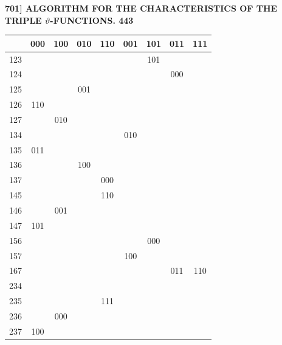 \documentclass[11pt]{article}
\begin{document}
\bigskip
\noindent\textbf{701] \quad ALGORITHM FOR THE CHARACTERISTICS OF THE TRIPLE $\vartheta$-FUNCTIONS. \hfill 443}

\medskip

\begin{center}
\begin{tabular}{|c||c|c|c|c|c|c|c|c|}
\hline
     & 000 & 100 & 010 & 110 & 001 & 101 & 011 & 111 \\
\hline\hline
123  &     &     &     &     &     & 101 &     &     \\
\hline
124  &     &     &     &     &     &     & 000 &     \\
\hline
125  &     &     & 001 &     &     &     &     &     \\
\hline
126  & 110 &     &     &     &     &     &     &     \\
\hline
127  &     & 010 &     &     &     &     &     &     \\
\hline
134  &     &     &     &     & 010 &     &     &     \\
\hline
135  & 011 &     &     &     &     &     &     &     \\
\hline
136  &     &     & 100 &     &     &     &     &     \\
\hline
137  &     &     &     & 000 &     &     &     &     \\
\hline
145  &     &     &     & 110 &     &     &     &     \\
\hline
146  &     & 001 &     &     &     &     &     &     \\
\hline
147  & 101 &     &     &     &     &     &     &     \\
\hline
156  &     &     &     &     &     & 000 &     &     \\
\hline
157  &     &     &     &     & 100 &     &     &     \\
\hline
167  &     &     &     &     &     &     & 011 & 110 \\
\hline\hline
234  &     &     &     &     &     &     &     &     \\
\hline
235  &     &     &     & 111 &     &     &     &     \\
\hline
236  &     & 000 &     &     &     &     &     &     \\
\hline
237  & 100 &     &     &     &     &     &     &     \\
\hline

\end{tabular}
\end{center}
\end{document}
